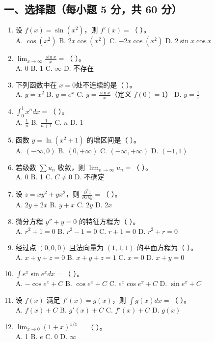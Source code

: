 \documentclass[11pt,a4paper]{article}
\begin{document}
\subsection*{一、选择题（每小题 5 分，共 60 分）}
\begin{enumerate}
    \item 设 $f(x) = \sin(x^2)$，则 $f'(x) = $（ ）。 \\
    A. $\cos(x^2)$ \quad B. $2x\cos(x^2)$ \quad C. $-2x\cos(x^2)$ \quad D. $2\sin x \cos x$
    \item $\lim_{x \to \infty} \frac{\sin x}{x} = $（ ）。 \\
    A. 0 \quad B. 1 \quad C. $\infty$ \quad D. 不存在
    \item 下列函数中在 $x=0$处不连续的是（ ）。 \\
    A. $y = x^2$ \quad B. $y = e^x$ \quad C. $y = \frac{\sin x}{x}$（定义 $f(0)=1$） \quad D. $y = \frac{1}{x}$
    \item $\int_0^1 x^n dx = $（ ）。 \\
    A. $\frac{1}{n}$ \quad B. $\frac{1}{n+1}$ \quad C. $n$ \quad D. 1
    \item 函数 $y = \ln(x^2+1)$ 的增区间是（ ）。 \\
    A. $(-\infty, 0)$ \quad B. $(0, +\infty)$ \quad C. $(-\infty, +\infty)$ \quad D. $(-1, 1)$
    \item 若级数 $\sum u_n$ 收敛，则 $\lim_{n \to \infty} u_n = $（ ）。 \\
    A. 0 \quad B. 1 \quad C. $C \neq 0$ \quad D. 不确定
    \item 设 $z = xy^2 + yx^2$，则 $\frac{\partial^2 z}{\partial x \partial y} = $（ ）。 \\
    A. $2y+2x$ \quad B. $y+x$ \quad C. $2y$ \quad D. $2x$
    \item 微分方程 $y'' + y = 0$ 的特征方程为（ ）。 \\
    A. $r^2+1=0$ \quad B. $r^2-1=0$ \quad C. $r+1=0$ \quad D. $r^2+r=0$
    \item 经过点 $(0,0,0)$ 且法向量为 $(1, 1, 1)$ 的平面方程为（ ）。 \\
    A. $x+y+z=0$ \quad B. $x+y+z=1$ \quad C. $x=0$ \quad D. $x+y=0$
    \item $\int e^x \sin e^x dx = $（ ）。 \\
    A. $-\cos e^x + C$ \quad B. $\cos e^x + C$ \quad C. $e^x \cos e^x + C$ \quad D. $\sin e^x + C$
    \item 设 $f(x)$ 满足 $f'(x) = g(x)$，则 $\int g(x) dx = $（ ）。 \\
    A. $f(x)+C$ \quad B. $g'(x)+C$ \quad C. $f'(x)+C$ \quad D. $g(x)$
    \item $\lim_{x \to 0} (1+x)^{1/x} = $（ ）。 \\
    A. 1 \quad B. $e$ \quad C. 0 \quad D. $\infty$
\end{enumerate}
\end{document}
